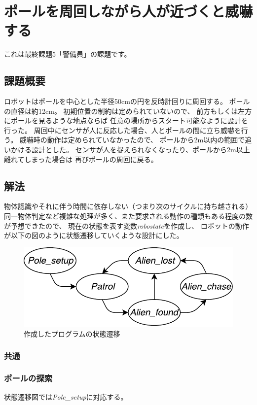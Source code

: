 \documentclass[main]{subfiles}
\begin{document}
\chapter{ポールを周回しながら人が近づくと威嚇する}

これは最終課題5「警備員」の課題です。

\section{課題概要}
ロボットはポールを中心とした半径50cmの円を反時計回りに周回する。
ポールの直径は約12cm。
初期位置の制約は定められていないので、
前方もしくは左方にポールを見るような地点ならば
任意の場所からスタート可能なように設計を行った。
周回中にセンサが人に反応した場合、人とポールの間に立ち威嚇を行う。
威嚇時の動作は定められていなかったので、
ポールから2m以内の範囲で追いかける設計とした。
センサが人を捉えられなくなったり、ポールから2m以上離れてしまった場合は
再びポールの周回に戻る。

\section{解法}
物体認識やそれに伴う時間に依存しない（つまり次のサイクルに持ち越される）
同一物体判定など複雑な処理が多く、また要求される動作の種類もある程度の数が予想できたので、
現在の状態を表す変数\textit{robostate}を作成し、
ロボットの動作が以下の図のように状態遷移していくような設計にした。
\begin{figure}[H]
	\centering
	\includegraphics{img/guard_state.pdf}
	\caption{作成したプログラムの状態遷移}
\end{figure}

\subsection{共通}

\subsection{ポールの探索}
状態遷移図では\textit{Pole\_setup}に対応する。
\end{document}
